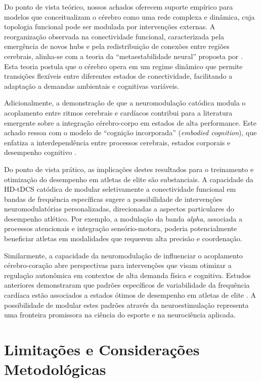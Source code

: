 Do ponto de vista teórico, nossos achados oferecem suporte empírico para modelos que conceitualizam o cérebro como uma rede complexa e dinâmica, cuja topologia funcional pode ser modulada por intervenções externas. A reorganização observada na conectividade funcional, caracterizada pela emergência de novos hubs e pela redistribuição de conexões entre regiões cerebrais, alinha-se com a teoria da ``metaestabilidade neural'' proposta por \cite{bullmore2009complex}. Esta teoria postula que o cérebro opera em um regime dinâmico que permite transições flexíveis entre diferentes estados de conectividade, facilitando a adaptação a demandas ambientais e cognitivas variáveis.

Adicionalmente, a demonstração de que a neuromodulação catódica modula o acoplamento entre ritmos cerebrais e cardíacos contribui para a literatura emergente sobre a integração cérebro-corpo em estados de alta performance. Este achado ressoa com o modelo de ``cognição incorporada'' (\textit{embodied cognition}), que enfatiza a interdependência entre processos cerebrais, estados corporais e desempenho cognitivo \cite{criscuolo2022cognition}.

Do ponto de vista prático, as implicações destes resultados para o treinamento e otimização do desempenho em atletas de elite são substanciais. A capacidade da HD-tDCS catódica de modular seletivamente a conectividade funcional em bandas de frequência específicas sugere a possibilidade de intervenções neuromodulatórias personalizadas, direcionadas a aspectos particulares do desempenho atlético. Por exemplo, a modulação da banda \emph{alpha}, associada a processos atencionais e integração sensório-motora, poderia potencialmente beneficiar atletas em modalidades que requerem alta precisão e coordenação.

Similarmente, a capacidade da neuromodulação de influenciar o acoplamento cérebro-coração abre perspectivas para intervenções que visam otimizar a regulação autonômica em contextos de alta demanda física e cognitiva. Estudos anteriores demonstraram que padrões específicos de variabilidade da frequência cardíaca estão associados a estados ótimos de desempenho em atletas de elite \cite{singh2024evaluating}. A possibilidade de modular estes padrões através da neuroestimulação representa uma fronteira promissora na ciência do esporte e na neurociência aplicada.


\section{Limitações e Considerações Metodológicas}
\label{sec:limitacoes}

